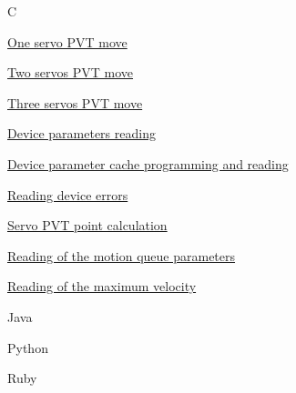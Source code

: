 \begin{DoxyItemize}
\item C
\begin{DoxyEnumerate}
\item \hyperlink{group__tutor__c__servomove1}{One servo P\+VT move}
\item \hyperlink{group__tutor__c__servomove2}{Two servos P\+VT move}
\item \hyperlink{group__tutor__c__servomove3}{Three servos P\+VT move}
\item \hyperlink{group__tutor__c__param}{Device parameters reading}
\item \hyperlink{group__tutor__c__param__cache}{Device parameter cache programming and reading}
\item \hyperlink{group__tutor__c__error__read}{Reading device errors}
\item \hyperlink{group__tutor__c__calculate__point}{Servo P\+VT point calculation}
\item \hyperlink{group__tutor__c__read__motion__queue}{Reading of the motion queue parameters}
\item \hyperlink{group__tutor__c__get__max__velocity}{Reading of the maximum velocity}
\end{DoxyEnumerate}
\item Java
\item Python
\item Ruby 
\end{DoxyItemize}